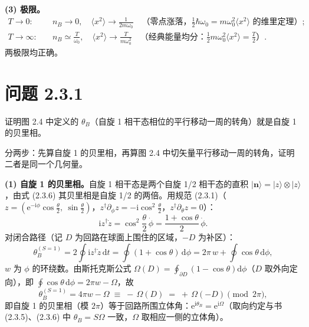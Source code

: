 \textbf{(3) 极限。}
\begin{align*}
T\to0:\quad& n_B\to0,\quad \langle x^2\rangle\to\frac{1}{2m\omega_0}
\quad\text{（零点涨落，} \tfrac12\hbar\omega_0=m\omega_0^2\langle x^2\rangle \text{ 的维里定理）};\\
T\to\infty:\quad& n_B\simeq\frac{T}{\omega_0},\quad
\langle x^2\rangle\to\frac{T}{m\omega_0^2}
\quad\text{（经典能量均分：}\tfrac12m\omega_0^2\langle x^2\rangle=\tfrac T2\text{）}.
\end{align*}
两极限均正确。

\section*{问题 2.3.1}
\begin{problem}
证明图 2.4 中定义的 $\theta_B$（自旋 1 相干态相位的平行移动一周的转角）就是自旋 1 的贝里相。
\end{problem}
\solution
分两步：先算自旋 1 的贝里相，再算图 2.4 中切矢量平行移动一周的转角，证明二者是同一个几何量。

\textbf{(1) 自旋 1 的贝里相。}自旋 1 相干态是两个自旋 1/2 相干态的直积 $|\pmb n\rangle=|z\rangle\otimes|z\rangle$，由式 (2.3.6) 其贝里相是自旋 1/2 的两倍。用规范 (2.3.1)（$z=(\mathrm{e}^{-\mathrm{i}\phi}\cos\frac\theta2,\ \sin\frac\theta2)$，$z^\dagger\partial_\phi z=-\mathrm{i}\cos^2\frac\theta2$，$z^\dagger\partial_\theta z=0$）：
\begin{equation*}
\mathrm{i}z^\dagger\dot z=\cos^2\frac\theta2\,\dot\phi=\frac{1+\cos\theta}2\,\dot\phi .
\end{equation*}
对闭合路径（记 $D$ 为回路在球面上围住的区域，$-D$ 为补区）：
\begin{equation*}
\theta_B^{(S=1)}=2\oint\mathrm{i}z^\dagger\dot z\,\mathrm{d}t=\oint(1+\cos\theta)\,\mathrm{d}\phi
=2\pi\,w+\oint\cos\theta\,\mathrm{d}\phi,
\end{equation*}
$w$ 为 $\phi$ 的环绕数。由斯托克斯公式 $\Omega(D)=\oint_{\partial D}(1-\cos\theta)\mathrm{d}\phi$（$D$ 取外向定向），即 $\oint\cos\theta\,\mathrm{d}\phi=2\pi w-\Omega$，故
\begin{equation*}
\theta_B^{(S=1)}=4\pi w-\Omega\;\equiv\;-\,\Omega(D)\;=\;+\,\Omega(-D)\pmod{2\pi},
\end{equation*}
即自旋 1 的贝里相（模 $2\pi$）等于回路所围立体角：$\mathrm{e}^{\mathrm{i}\theta_B}=\mathrm{e}^{\mathrm{i}\Omega}$（取向约定与书 (2.3.5)、(2.3.6) 中 $\theta_B=S\Omega$ 一致，$\Omega$ 取相应一侧的立体角）。

